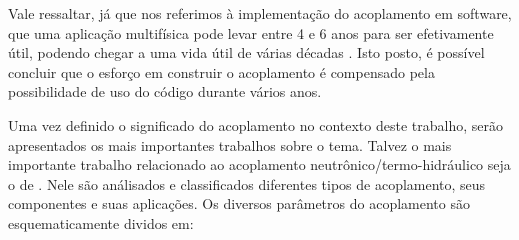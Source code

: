\documentclass[12pt,openright,twoside,a4paper,english,french,spanish,brazil]{abntex2}
\begin{document}
Vale ressaltar, já que nos referimos à implementação do acoplamento em software, que uma aplicação multifísica 
pode levar entre 4 e 6 anos para ser efetivamente útil, podendo chegar a uma vida útil de várias décadas 
\cite{Graham2004}. Isto posto, é possível concluir que o esforço em construir o acoplamento é compensado 
pela possibilidade de uso do código durante vários anos.

Uma vez definido o significado do acoplamento no contexto deste trabalho, serão apresentados os mais importantes 
trabalhos sobre o tema. Talvez o mais importante trabalho relacionado ao acoplamento 
neutrônico/termo-hidráulico seja o de \cite{Ivanov2007}. Nele são análisados e classificados diferentes tipos de 
acoplamento, seus componentes e suas aplicações. Os diversos parâmetros do acoplamento são esquematicamente dividos em: 
\end{document}
